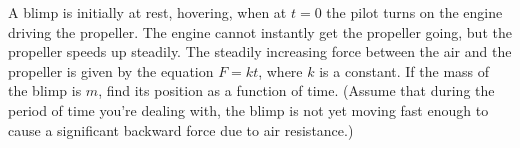         A blimp is initially at rest, hovering, when at $t=0$ the
        pilot turns on the engine driving the propeller. The engine cannot
        instantly get the propeller going, but the propeller speeds
        up steadily. The steadily increasing force between the air
        and the propeller is given by the equation $F=kt$, where $k$ is
        a constant. If the mass of the blimp is $m$, find its position
        as a function of time. (Assume that during the period of
        time you're dealing with, the blimp is not yet moving fast
        enough to cause a significant backward force due to air
        resistance.)\answercheck
